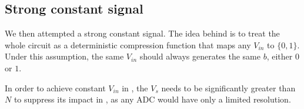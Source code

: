 %
%
%


\subsection{Strong constant signal} \label{Constant}
We then attempted a strong constant signal. The idea behind is to treat the whole circuit as a deterministic compression function that maps any $V_{in}$ to $\{0,1\}$. Under this assumption, the same $V_{in}$ should always generates the same $b$, either $0$ or $1$.

In order to achieve constant $V_{in}$ in , the $V_s$ needs to be significantly greater than $N$ to suppress its impact in , as any ADC would have only a limited resolution.


